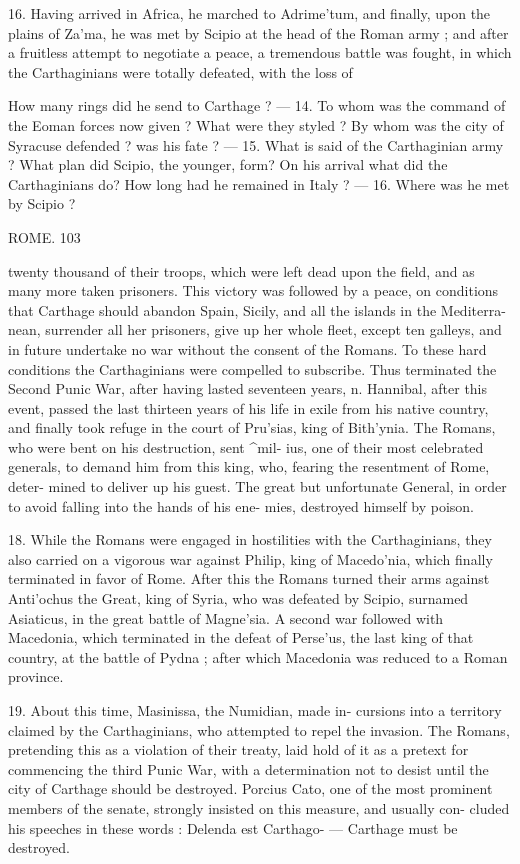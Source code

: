 \documentclass[openany,a4paper]{memoir}
\begin{document}
16. Having arrived in Africa, he marched to Adrime'tum, 
and finally, upon the plains of Za'ma, he was met by Scipio 
at the head of the Roman army ; and after a fruitless attempt 
to negotiate a peace, a tremendous battle was fought, in which 
the Carthaginians were totally defeated, with the loss of 

How many rings did he send to Carthage ? — 14. To whom was the 
command of the Eoman forces now given ? What were they styled ? 
By whom was the city of Syracuse defended ? \Vhat was his fate ? — 
15. What is said of the Carthaginian army ? What plan did Scipio, 
the younger, form? On his arrival what did the Carthaginians do? 
How long had he remained in Italy ? — 16. Where was he met by Scipio ? 



ROME. 103 

twenty thousand of their troops, which were left dead upon 
the field, and as many more taken prisoners. This victory 
was followed by a peace, on conditions that Carthage should 
abandon Spain, Sicily, and all the islands in the Mediterra- 
nean, surrender all her prisoners, give up her whole fleet, 
except ten galleys, and in future undertake no war without 
the consent of the Romans. To these hard conditions the 
Carthaginians were compelled to subscribe. Thus terminated 
the Second Punic War, after having lasted seventeen years, 
n. Hannibal, after this event, passed the last thirteen 
years of his life in exile from his native country, and finally 
took refuge in the court of Pru'sias, king of Bith'ynia. 
The Romans, who were bent on his destruction, sent ^mil- 
ius, one of their most celebrated generals, to demand him 
from this king, who, fearing the resentment of Rome, deter- 
mined to deliver up his guest. The great but unfortunate 
General, in order to avoid falling into the hands of his ene- 
mies, destroyed himself by poison. 

18. While the Romans were engaged in hostilities with 
the Carthaginians, they also carried on a vigorous war 
against Philip, king of Macedo'nia, which finally terminated 
in favor of Rome. After this the Romans turned their 
arms against Anti'ochus the Great, king of Syria, who was 
defeated by Scipio, surnamed Asiaticus, in the great battle 
of Magne'sia. A second war followed with Macedonia, 
which terminated in the defeat of Perse'us, the last king of 
that country, at the battle of Pydna ; after which Macedonia 
was reduced to a Roman province. 

19. About this time, Masinissa, the Numidian, made in- 
cursions into a territory claimed by the Carthaginians, who 
attempted to repel the invasion. The Romans, pretending 
this as a violation of their treaty, laid hold of it as a pretext 
for commencing the third Punic War, with a determination 
not to desist until the city of Carthage should be destroyed. 
Porcius Cato, one of the most prominent members of the 
senate, strongly insisted on this measure, and usually con- 
cluded his speeches in these words : Delenda est Carthago- — 
Carthage must be destroyed. 
\end{document}
